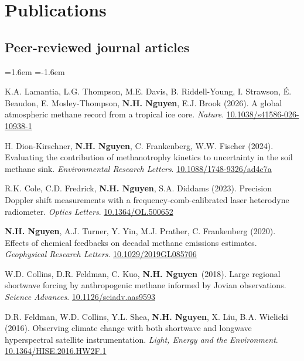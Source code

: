 \documentclass[11pt,letterpaper]{article}
\newcommand{\me}{\textbf{N.H. Nguyen}}
\newenvironment{pubs}
  {\begin{list}{}{\leftmargin=1.6em \itemindent=-1.6em
   \topsep=3pt \itemsep=4pt \parsep=0pt}}
  {\end{list}}
\let\oldsection\section
\renewcommand{\section}[1]{\Needspace*{5\baselineskip}\oldsection{#1}}
\let\oldsubsection\subsection
\renewcommand{\subsection}[1]{\Needspace*{4\baselineskip}\oldsubsection{#1}}
\begin{document}
\section{Publications}

\subsection{Peer-reviewed journal articles}
\begin{pubs}
\item[6.] K.A. Lamantia, L.G. Thompson, M.E. Davis, B. Riddell-Young, I. Strawson, É. Beaudon,
  E. Mosley-Thompson, \me, E.J. Brook (2026). A global atmospheric methane record from a tropical
  ice core. \textit{Nature}. \href{https://doi.org/10.1038/s41586-026-10938-1}{10.1038/s41586-026-10938-1}

\item[5.] H. Dion-Kirschner, \me, C. Frankenberg, W.W. Fischer (2024). Evaluating the contribution of
  methanotrophy kinetics to uncertainty in the soil methane sink. \textit{Environmental Research Letters}.
  \href{https://doi.org/10.1088/1748-9326/ad4c7a}{10.1088/1748-9326/ad4c7a}

\item[4.] R.K. Cole, C.D. Fredrick, \me, S.A. Diddams (2023). Precision Doppler shift measurements with a
  frequency-comb-calibrated laser heterodyne radiometer. \textit{Optics Letters}.
  \href{https://doi.org/10.1364/OL.500652}{10.1364/OL.500652}

\item[3.] \me, A.J. Turner, Y. Yin, M.J. Prather, C. Frankenberg (2020). Effects of chemical feedbacks on
  decadal methane emissions estimates. \textit{Geophysical Research Letters}.
  \href{https://doi.org/10.1029/2019GL085706}{10.1029/2019GL085706}

\item[2.] W.D. Collins, D.R. Feldman, C. Kuo, \me\ (2018). Large regional shortwave forcing by
  anthropogenic methane informed by Jovian observations. \textit{Science Advances}.
  \href{https://doi.org/10.1126/sciadv.aas9593}{10.1126/sciadv.aas9593}

\item[1.] D.R. Feldman, W.D. Collins, Y.L. Shea, \me, X. Liu, B.A. Wielicki (2016). Observing climate change
  with both shortwave and longwave hyperspectral satellite instrumentation. \textit{Light, Energy and the
  Environment}. \href{https://doi.org/10.1364/HISE.2016.HW2F.1}{10.1364/HISE.2016.HW2F.1}
\end{pubs}
\end{document}
